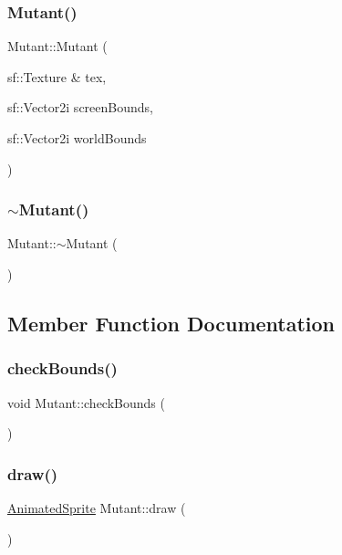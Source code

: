 \subsubsection{\texorpdfstring{Mutant()}{Mutant()}}
{\footnotesize\ttfamily Mutant\+::\+Mutant (\begin{DoxyParamCaption}\item[{sf\+::\+Texture \&}]{tex,  }\item[{sf\+::\+Vector2i}]{screen\+Bounds,  }\item[{sf\+::\+Vector2i}]{world\+Bounds }\end{DoxyParamCaption})}

\mbox{\label{class_mutant_a03dc2cf4d08ea08bea6cd4ded784dfc1}} 
\subsubsection{\texorpdfstring{$\sim$\+Mutant()}{~Mutant()}}
{\footnotesize\ttfamily Mutant\+::$\sim$\+Mutant (\begin{DoxyParamCaption}{ }\end{DoxyParamCaption})}



\subsection{Member Function Documentation}
\mbox{\label{class_mutant_a46424e3134923fed261aec4cfeee43d5}} 
\subsubsection{\texorpdfstring{check\+Bounds()}{checkBounds()}}
{\footnotesize\ttfamily void Mutant\+::check\+Bounds (\begin{DoxyParamCaption}{ }\end{DoxyParamCaption})}

\mbox{\label{class_mutant_ad085db34f2e45e82b6b7bb6bfc4be1c7}} 
\subsubsection{\texorpdfstring{draw()}{draw()}}
{\footnotesize\ttfamily \hyperlink{class_animated_sprite}{Animated\+Sprite} Mutant\+::draw (\begin{DoxyParamCaption}{ }\end{DoxyParamCaption})}

